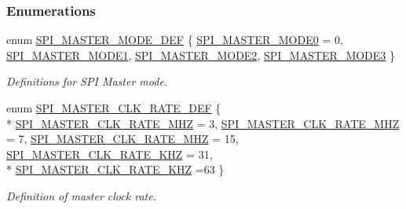 \subsubsection*{Enumerations}
\begin{DoxyCompactItemize}
\item 
enum \hyperlink{group___s_p_i___m_a_s_t_e_r_ga9b0bdd65837c35731a6834dfa4a0a049}{S\+P\+I\+\_\+\+M\+A\+S\+T\+E\+R\+\_\+\+M\+O\+D\+E\+\_\+\+D\+EF} \{ \hyperlink{group___s_p_i___m_a_s_t_e_r_gga9b0bdd65837c35731a6834dfa4a0a049aa5d478d17537938b9adb906b72875349}{S\+P\+I\+\_\+\+M\+A\+S\+T\+E\+R\+\_\+\+M\+O\+D\+E0} = 0, 
\hyperlink{group___s_p_i___m_a_s_t_e_r_gga9b0bdd65837c35731a6834dfa4a0a049a2762ebdf9a8f96bad970438d579a9dae}{S\+P\+I\+\_\+\+M\+A\+S\+T\+E\+R\+\_\+\+M\+O\+D\+E1}, 
\hyperlink{group___s_p_i___m_a_s_t_e_r_gga9b0bdd65837c35731a6834dfa4a0a049ac802af208a78407642cb0ba05dc3f154}{S\+P\+I\+\_\+\+M\+A\+S\+T\+E\+R\+\_\+\+M\+O\+D\+E2}, 
\hyperlink{group___s_p_i___m_a_s_t_e_r_gga9b0bdd65837c35731a6834dfa4a0a049a695e76f59a8f8a8c253fa9d28796b07e}{S\+P\+I\+\_\+\+M\+A\+S\+T\+E\+R\+\_\+\+M\+O\+D\+E3}
 \}\begin{DoxyCompactList}\small\item\em Definitions for S\+PI Master mode. \end{DoxyCompactList}
\item 
enum \hyperlink{group___s_p_i___m_a_s_t_e_r_ga6a763a6c43f6042aad2c8441d6442180}{S\+P\+I\+\_\+\+M\+A\+S\+T\+E\+R\+\_\+\+C\+L\+K\+\_\+\+R\+A\+T\+E\+\_\+\+D\+EF} \{ \\*
\hyperlink{group___s_p_i___m_a_s_t_e_r_gga6a763a6c43f6042aad2c8441d6442180a4052a5a6b74a24e1f6b6c33255b118b7}{S\+P\+I\+\_\+\+M\+A\+S\+T\+E\+R\+\_\+\+C\+L\+K\+\_\+\+R\+A\+T\+E\+\_\+M\+HZ} = 3, 
\hyperlink{group___s_p_i___m_a_s_t_e_r_gga6a763a6c43f6042aad2c8441d6442180a4747772dabdae2d99cc0a80621c96a0b}{S\+P\+I\+\_\+\+M\+A\+S\+T\+E\+R\+\_\+\+C\+L\+K\+\_\+\+R\+A\+T\+E\+\_\+M\+HZ} = 7, 
\hyperlink{group___s_p_i___m_a_s_t_e_r_gga6a763a6c43f6042aad2c8441d6442180a14b1aa7fc9c8ff68737cf2b9ba72e716}{S\+P\+I\+\_\+\+M\+A\+S\+T\+E\+R\+\_\+\+C\+L\+K\+\_\+\+R\+A\+T\+E\+\_\+M\+HZ} = 15, 
\hyperlink{group___s_p_i___m_a_s_t_e_r_gga6a763a6c43f6042aad2c8441d6442180ad13f82a8a135f8837eb0cf2f40acb381}{S\+P\+I\+\_\+\+M\+A\+S\+T\+E\+R\+\_\+\+C\+L\+K\+\_\+\+R\+A\+T\+E\+\_\+K\+HZ} = 31, 
\\*
\hyperlink{group___s_p_i___m_a_s_t_e_r_gga6a763a6c43f6042aad2c8441d6442180a6c05bf32dd595ec0426b9e4cfd1bdbff}{S\+P\+I\+\_\+\+M\+A\+S\+T\+E\+R\+\_\+\+C\+L\+K\+\_\+\+R\+A\+T\+E\+\_\+K\+HZ} =63
 \}\begin{DoxyCompactList}\small\item\em Definition of master clock rate. \end{DoxyCompactList}
\end{DoxyCompactItemize}
